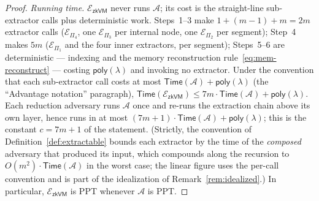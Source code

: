 \begin{proof}
\medskip
\noindent\textit{Running time.}
$\mathcal{E}_{\mathsf{zkVM}}$ never runs $\mathcal{A}$; its cost is the
straight-line sub-extractor calls plus deterministic work.  Steps~1--3 make
$1+(m-1)+m=2m$ extractor calls ($\mathcal{E}_{\Pi_4}$, one
$\mathcal{E}_{\Pi_3}$ per internal node, one $\mathcal{E}_{\Pi_2}$ per
segment); Step~4 makes $5m$ ($\mathcal{E}_{\Pi_1}$ and the four inner
extractors, per segment); Steps~5--6 are deterministic --- indexing and the
memory reconstruction rule~\eqref{eq:mem-reconstruct} --- costing
$\mathsf{poly}(\lambda)$ and invoking no extractor.  Under the convention that
each sub-extractor call costs at most
$\mathsf{Time}(\mathcal{A})+\mathsf{poly}(\lambda)$ (the ``Advantage
notation'' paragraph), $\mathsf{Time}(\mathcal{E}_{\mathsf{zkVM}}) \le
7m\cdot\mathsf{Time}(\mathcal{A})+\mathsf{poly}(\lambda)$.  Each reduction
adversary runs $\mathcal{A}$ once and re-runs the extraction chain above its
own layer, hence runs in at most
$(7m+1)\cdot\mathsf{Time}(\mathcal{A})+\mathsf{poly}(\lambda)$; this is the
constant $c=7m+1$ of the statement.  (Strictly, the convention of
Definition~\ref{def:extractable} bounds each extractor by the time of the
\emph{composed} adversary that produced its input, which compounds along the
recursion to $O(m^2)\cdot\mathsf{Time}(\mathcal{A})$ in the worst case; the
linear figure uses the per-call convention and is part of the idealization of
Remark~\ref{rem:idealized}.)
In particular,
$\mathcal{E}_{\mathsf{zkVM}}$ is PPT whenever $\mathcal{A}$ is PPT.
\end{proof}
